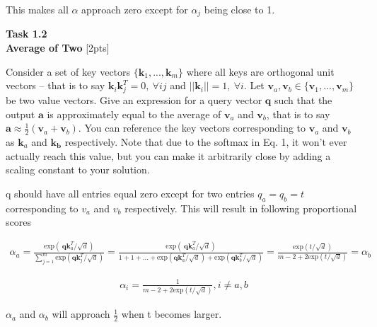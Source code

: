 \documentclass[12pt,article]{article}
\newenvironment{task}[2][Task]
    { \begin{mdframed}[backgroundcolor=gray!20] \textbf{#1 #2} \\}
    {  \end{mdframed}}
\begin{document}
This makes all $\alpha$ approach zero except for $\alpha_j$ being close to 1.
\begin{task}{1.2} 
\textbf{Average of Two} [2pts]

Consider a set of key vectors $\{\mathbf{k}_1, ... , \mathbf{k}_m\}$ where all keys are orthogonal unit vectors -- that is to say $\mathbf{k}_i\mathbf{k}_j^T =0,~\forall ij$ and $||\mathbf{k}_i||=1,~\forall i$. Let $\mathbf{v}_a, \mathbf{v}_b \in \{\mathbf{v}_1, ..., \mathbf{v}_m\}$ be two value vectors. Give an expression for a query vector $\mathbf{q}$ such that the output $\mathbf{a}$ is approximately equal to the average of $\mathbf{v}_a$ and $\mathbf{v}_b$, that is to say $\mathbf{a} \approx \frac{1}{2}(\mathbf{v}_a + \mathbf{v}_b)$. You can reference the key vectors corresponding to $\mathbf{v}_a$ and $\mathbf{v}_b$ as $\mathbf{k}_a$ and $\mathbf{k_b}$ respectively. Note that due to the softmax in Eq. 1, it won't ever actually reach this value, but you can make it arbitrarily close by adding a scaling constant to your solution.
\end{task}

q should have all entries equal zero except for two entries $q_a = q_b = t$ corresponding to $v_a$ and $v_b$ respectively. This will result in following proportional scores

\begin{eqnarray}
\alpha_a = \frac{\mbox{exp}\left(~\mathbf{q}\mathbf{k}_a^T / \sqrt d\right)}{\sum_{j=1}^m \mbox{exp}\left(\mathbf{q}\mathbf{k}_j^T / \sqrt d\right)} = \frac{\mbox{exp}\left(~\mathbf{q}\mathbf{k}_a^T / \sqrt d\right)}{1 + 1 + ... + \mbox{exp}\left(\mathbf{q}\mathbf{k}_a^T / \sqrt d\right) + \mbox{exp}\left(\mathbf{q}\mathbf{k}_b^T / \sqrt d\right)} 
= \frac{\mbox{exp}\left(t / \sqrt d\right)}{m - 2 + 2 \mbox{exp}\left(t / \sqrt d\right)} = \alpha_b
\end{eqnarray}

\begin{eqnarray}
\alpha_i = \frac{1}{m - 2 + 2 \mbox{exp}\left(t / \sqrt d\right)}, i \neq a,b
\end{eqnarray}

$\alpha_a$ and $\alpha_b$ will approach $\frac{1}{2}$ when t becomes larger.
\end{document}
